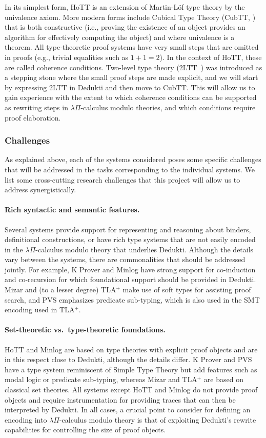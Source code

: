 In its simplest form, HoTT is an extension of Martin-L\"of type theory by the
univalence axiom. More modern forms include Cubical Type Theory (CubTT,
\cite{cohen:cubical}) that is both constructive (i.e., proving the existence of
an object provides an algorithm for effectively computing the object) and where
univalence is a theorem. All type-theoretic proof systems have very small steps
that are omitted in proofs (e.g., trivial equalities such as $1+1=2$). In the
context of HoTT, these are called coherence conditions. Two-level type theory
(2LTT~\cite{annenkov:two-level}) was introduced as a stepping stone where the
small proof steps are made explicit, and we will start by expressing 2LTT in
Dedukti and then move to CubTT. This will allow us to gain experience with
the extent to which coherence conditions can be supported as rewriting steps in
$\lambda\Pi$-calculus modulo theories, and which conditions require proof
elaboration.

\subsubsection*{Challenges}

As explained above, each of the systems considered poses some specific
challenges that will be addressed in the tasks corresponding to the
individual systems. We list some cross-cutting research challenges
that this project will allow us to address synergistically.

\paragraph*{Rich syntactic and semantic features.}
Several systems provide support for representing and reasoning about
binders, definitional constructions, or have rich type systems that
are not easily encoded in the $\lambda\Pi$-calculus modulo theory that
underlies Dedukti.  Although the details vary between the systems,
there are commonalities that should be addressed jointly. For example,
K Prover and Minlog have strong support for co-induction and co-recursion
for which foundational support should be provided in Dedukti. Mizar
and (to a lesser degree) TLA$^+$ make use of soft types for assisting
proof search, and PVS emphasizes predicate sub-typing, which is also
used in the SMT encoding used in TLA$^+$.

\paragraph*{Set-theoretic vs.\ type-theoretic foundations.}
HoTT and Minlog are based on type theories with explicit proof objects and are
in this respect close to Dedukti, although the details differ. K Prover
and PVS have a type system reminiscent of Simple Type Theory but add features
such as modal logic or predicate sub-typing, whereas Mizar and TLA$^+$ are based
on classical set theories. All systems except HoTT and Minlog do not provide
proof objects and require instrumentation for providing traces that can then be
interpreted by Dedukti. In all cases, a crucial point to consider for defining
an encoding into $\lambda\Pi$-calculus modulo theory is that of exploiting
Dedukti's rewrite capabilities for controlling the size of proof objects.

